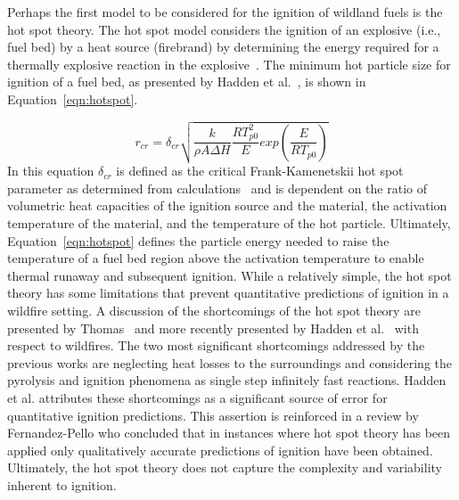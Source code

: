     Perhaps the first model to be considered for the ignition of wildland fuels is the hot spot theory. The hot spot model considers the ignition of an explosive (i.e., fuel bed) by a heat source (firebrand) by determining the energy required for a thermally explosive reaction in the explosive~\cite{Zinn1962InitiationSpots, Thomas1965}. The minimum hot particle size for ignition of a fuel bed, as presented by Hadden et al.~\cite{Hadden2011}, is shown in Equation~\ref{eqn:hotspot}.
    
        \begin{equation}
            r_{cr} = \delta_{cr}\sqrt{\frac{k}{\rho A \Delta H}\frac{RT^{2}_{p0}}{E} exp\left(\frac{E}{RT_{p0}} \right)}
            \label{eqn:hotspot}
        \end{equation}
    In this equation $\delta_{cr}$ is defined as the critical Frank-Kamenetskii hot spot parameter as determined from calculations~\cite{Goldshlager} and is dependent on the ratio of volumetric heat capacities of the ignition source and the material, the activation temperature of the material, and the temperature of the hot particle. Ultimately, Equation~\ref{eqn:hotspot} defines the particle energy needed to raise the temperature of a fuel bed region above the activation temperature to enable thermal runaway and subsequent ignition. While a relatively simple, the hot spot theory has some limitations that prevent quantitative predictions of ignition in a wildfire setting. A discussion of the shortcomings of the hot spot theory are presented by Thomas~\cite{Thomas1965} and more recently presented by Hadden et al.~\cite{Hadden2011} with respect to wildfires. The two most significant shortcomings addressed by the previous works are neglecting heat losses to the surroundings and considering the pyrolysis and ignition phenomena as single step infinitely fast reactions. Hadden et al. attributes these shortcomings as a significant source of error for quantitative ignition predictions. This assertion is reinforced in a review by Fernandez-Pello who concluded that in instances where hot spot theory has been applied only qualitatively accurate predictions of ignition have been obtained. Ultimately, the hot spot theory does not capture the complexity and variability inherent to ignition. 
    
